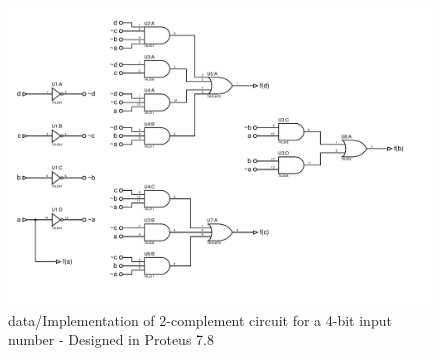         \begin{figure}[H]
            \begin{centering}
            \includegraphics[width=1\textwidth]{data/ImplementacionEj4}
            \par\end{centering}
            \caption{data/Implementation of 2-complement circuit for a 4-bit input number - Designed in Proteus 7.8}
        \end{figure}
        

